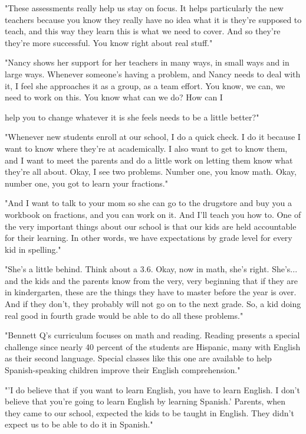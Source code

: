 "These assessments really help us stay on focus. It helps particularly the new teachers because you know they really have no idea what it is they're supposed to teach, and this way they learn this is what we need to cover. And so they're they're more successful. You know right about real stuff."

"Nancy shows her support for her teachers in many ways, in small ways and in large ways. Whenever someone's having a problem, and Nancy needs to deal with it, I feel she approaches it as a group, as a team effort. You know, we can, we need to work on this. You know what can we do? How can I

help you to change whatever it is she feels needs to be a little better?"

"Whenever new students enroll at our school, I do a quick check. I do it because I want to know where they're at academically. I also want to get to know them, and I want to meet the parents and do a little work on letting them know what they're all about. Okay, I see two problems. Number one, you know math. Okay, number one, you got to learn your fractions."

"And I want to talk to your mom so she can go to the drugstore and buy you a workbook on fractions, and you can work on it. And I'll teach you how to. One of the very important things about our school is that our kids are held accountable for their learning. In other words, we have expectations by grade level for every kid in spelling."

"She's a little behind. Think about a 3.6. Okay, now in math, she's right. She's... and the kids and the parents know from the very, very beginning that if they are in kindergarten, these are the things they have to master before the year is over. And if they don't, they probably will not go on to the next grade. So, a kid doing real good in fourth grade would be able to do all these problems."

"Bennett Q's curriculum focuses on math and reading. Reading presents a special challenge since nearly 40 percent of the students are Hispanic, many with English as their second language. Special classes like this one are available to help Spanish-speaking children improve their English comprehension."

"'I do believe that if you want to learn English, you have to learn English. I don't believe that you're going to learn English by learning Spanish.' Parents, when they came to our school, expected the kids to be taught in English. They didn't expect us to be able to do it in Spanish."

